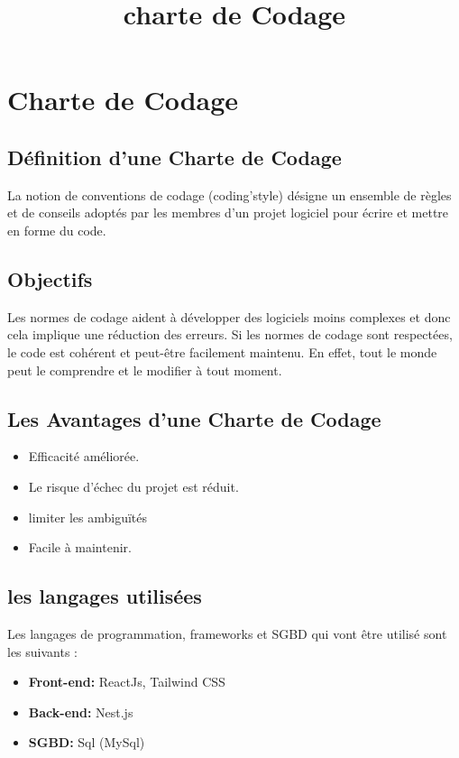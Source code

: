\documentclass[11pt,fleqn]{book} %
\begin{document}
\title{charte de Codage}
\pagestyle{empty} %

\tableofcontents %


\pagestyle{fancy} %

\chapter{Charte de Codage}
\section{ Définition d’une Charte de Codage}
La notion de conventions de codage (coding'style) désigne un ensemble de règles et de conseils adoptés par les membres d’un projet logiciel pour écrire et mettre en forme du code.
\section{Objectifs}
Les normes de codage aident à développer des logiciels moins complexes et donc cela implique une réduction des erreurs. Si les normes de codage sont respectées, le code est cohérent et peut-être facilement maintenu. En effet, tout le monde peut le comprendre et le modifier à tout moment.
\section{ Les Avantages d’une Charte de Codage}
\begin{itemize}
    \item Efficacité améliorée. 
    \item  Le risque d'échec du projet est réduit.
    \item limiter les ambiguïtés
    \item  Facile à maintenir.
\end{itemize}
\section{les langages utilisées}
Les langages de programmation, frameworks et SGBD qui vont être utilisé sont les suivants :
\begin{itemize}
    \item \textbf{Front-end: } ReactJs, Tailwind CSS
    \item \textbf{Back-end: }Nest.js
    \item \textbf{SGBD: }Sql (MySql)
\end{itemize}
\end{document}

